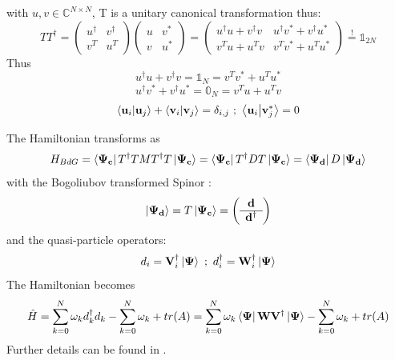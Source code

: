 \documentclass[Master]{subfiles}
\begin{document}
with $ u,v  \in \mathbb{C}^{N\times N}$,
T is a unitary canonical transformation thus:
$$
T T^{\dag} =
\left(
\begin{array}{c|c}
   u^{\dag}  &  v^{\dag} \\
   \hline 
   v^{T} &  u^{T}
\end{array}\right)
\left(
\begin{array}{c|c}
   u  &  v^* \\
   \hline 
   v &  u^*
\end{array}\right)
=
\left(
\begin{array}{c|c}
   u^{\dag}u+v^{\dag}v &  u^{\dag}v^*+v^{\dag}u^* \\
   \hline 
   v^{T}u+u^{T}v &  v^{T}v^*+u^{T}u^*
\end{array}\right)
\overset{!}{=} \mathbb{1}_{2N}
$$
Thus 
$$u^{\dag}u+v^{\dag}v = \mathbb{1}_{N} =  v^{T}v^*+u^{T}u^*$$
$$u^{\dag}v^*+v^{\dag}u^* = \mathbb{0}_{N} =  v^{T}u+u^{T}v$$
$$\braket{\vec{u}_i}{\vec{u}_j} + \braket{\vec{v}_i}{\vec{v}_j} = \delta_{i,j} \ ; \ \braket{\vec{u}_i}{\vec{v}_j^*} = 0$$
                                                               
The Hamiltonian transforms as  \cite{blaizot1986quantum}
$$
H_{BdG} = \bra{\mathbf{\Psi_c}}T^{\dag}TMT^{\dag}T\ket{\mathbf{\Psi_c}} = \bra{\mathbf{\Psi_c}}T^{\dag}DT\ket{\mathbf{\Psi_c}} = \bra{\mathbf{\Psi_d}}D\ket{\mathbf{\Psi_d}}
$$
 with the Bogoliubov transformed Spinor :
 $$ \ket{\mathbf{\Psi_d}} = 
 T\ket{\mathbf{\Psi_c}} =
 \left(
\begin{array}{c}
\mathbf{d} \\
\hline 
\mathbf{d}^{\dag}
\end{array}
\right)$$
and the quasi-particle operators:
$$
d_i = \mathbf{V}_i^{\dag} \ket{\mathbf{\Psi}} \ ; \  d_i^{\dag} = \mathbf{W}_i^{\dag} \ket{\mathbf{\Psi}}
 $$ 
The Hamiltonian becomes
$$
\hat{H} =\sum^N_{k = 0} \omega_k  d_k^{\dag}d_k - \sum^N_{k=0} \omega_k + tr(A) =
\sum^N_{k = 0} \omega_k  \bra{\mathbf{\Psi}}\mathbf{W} \mathbf{V}^{\dag}\ket{\mathbf{\Psi}} - \sum^N_{k=0} \omega_k + tr(A) 
$$
Further details can be found in \cite{blaizot1986quantum}.
\end{document}
